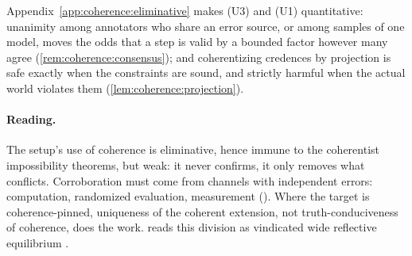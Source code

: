 Appendix~\ref{app:coherence:eliminative} makes (U3) and (U1) quantitative: unanimity among annotators who share an error source, or among samples of one model, moves the odds that a step is valid by a bounded factor however many agree (\cref{rem:coherence:consensus}); and coherentizing credences by projection is safe exactly when the constraints are sound, and strictly harmful when the actual world violates them (\cref{lem:coherence:projection}).

\paragraph{Reading.} The setup's use of coherence is eliminative, hence immune to the coherentist impossibility theorems, but weak: it never confirms, it only removes what conflicts. Corroboration must come from channels with independent errors: computation, randomized evaluation, measurement (). Where the target is coherence-pinned, uniqueness of the coherent extension, not truth-conduciveness of coherence, does the work.  reads this division as vindicated wide reflective equilibrium \citep{goodman1955fact,daniels1979wide}.
